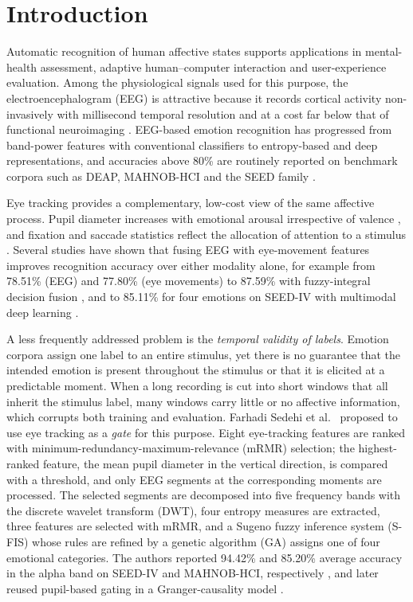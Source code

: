 \documentclass[11pt,a4paper]{article}
\begin{document}
\section{Introduction}
\label{sec:intro}

Automatic recognition of human affective states supports applications in mental-health assessment, adaptive human--computer interaction and user-experience evaluation. Among the physiological signals used for this purpose, the electroencephalogram (EEG) is attractive because it records cortical activity non-invasively with millisecond temporal resolution and at a cost far below that of functional neuroimaging \cite{Alarcao2019,Jenke2014}. EEG-based emotion recognition has progressed from band-power features with conventional classifiers to entropy-based and deep representations, and accuracies above 80\% are routinely reported on benchmark corpora such as DEAP, MAHNOB-HCI and the SEED family \cite{Koelstra2012,Soleymani2012db,ZhengLu2015,Zheng2019}.

Eye tracking provides a complementary, low-cost view of the same affective process. Pupil diameter increases with emotional arousal irrespective of valence \cite{Bradley2008,Partala2003}, and fixation and saccade statistics reflect the allocation of attention to a stimulus \cite{Lim2020}. Several studies have shown that fusing EEG with eye-movement features improves recognition accuracy over either modality alone, for example from 78.51\% (EEG) and 77.80\% (eye movements) to 87.59\% with fuzzy-integral decision fusion \cite{Lu2015}, and to 85.11\% for four emotions on SEED-IV with multimodal deep learning \cite{Zheng2019}.

A less frequently addressed problem is the \emph{temporal validity of labels}. Emotion corpora assign one label to an entire stimulus, yet there is no guarantee that the intended emotion is present throughout the stimulus or that it is elicited at a predictable moment. When a long recording is cut into short windows that all inherit the stimulus label, many windows carry little or no affective information, which corrupts both training and evaluation. Farhadi Sedehi et al.\ \cite{FarhadiSedehi2024a} proposed to use eye tracking as a \emph{gate} for this purpose. Eight eye-tracking features are ranked with minimum-redundancy-maximum-relevance (mRMR) selection; the highest-ranked feature, the mean pupil diameter in the vertical direction, is compared with a threshold, and only EEG segments at the corresponding moments are processed. The selected segments are decomposed into five frequency bands with the discrete wavelet transform (DWT), four entropy measures are extracted, three features are selected with mRMR, and a Sugeno fuzzy inference system (S-FIS) whose rules are refined by a genetic algorithm (GA) assigns one of four emotional categories. The authors reported 94.42\% and 85.20\% average accuracy in the alpha band on SEED-IV and MAHNOB-HCI, respectively \cite{FarhadiSedehi2024a}, and later reused pupil-based gating in a Granger-causality model \cite{FarhadiSedehi2024b}.
\end{document}
